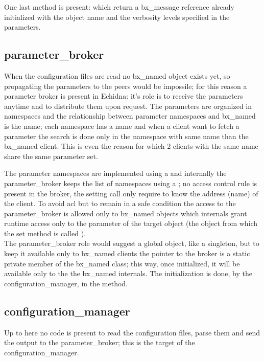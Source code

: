 One last method is present: \mbox{} which
return a bx\_message reference already initialized with the object name and the verbosity levels specified in the parameters.
\subsection{parameter\_broker}
When the configuration files are read no bx\_named object exists yet, so propagating the parameters to the
peers would be impossile; for this reason a parameter broker is present in Echidna: it's role is to receive
the parameters anytime and to distribute them upon request. The parameters are organized in namespaces and 
the relationship between parameter namespaces and bx\_named is the name; each namespace has a name and 
when a client want to fetch a parameter the search is done only in the namespace with same name than the bx\_named
client. This is even the reason for which 2 clients with the same name share the same parameter set.

The parameter namespaces are implemented using a  and internally
the parameter\_broker keeps the list of namespaces using a ; no 
access control rule is present in the broker, the setting call only require to know the address (name) of the client.
To avoid acl but to remain in a safe condition the access to the parameter\_broker is allowed only to
bx\_named objects which internals grant runtime access only to the parameter of the target object (the object from
which the set method is called ).\\
The parameter\_broker role would suggest a global object, like a singleton, but to keep it available only to bx\_named
clients the pointer to the broker is a static private member of the bx\_named class; this way, once initialized, it will 
be available only to the the bx\_named internals. The initialization is done, by the configuration\_manager, in the 
\mbox{} method.

\subsection{configuration\_manager}
Up to here no code is present to read the configuration files, parse them and send the output to the parameter\_broker;
this is the target of the configuration\_manager.

